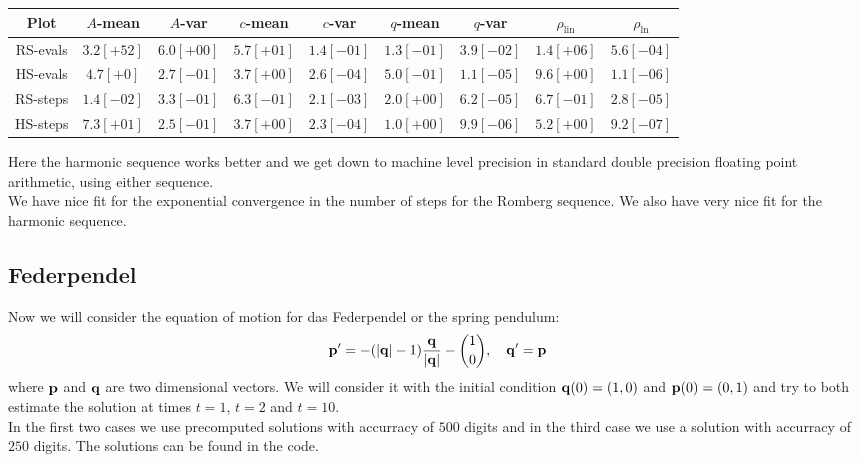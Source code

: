 \begin{table}[H]
    \centering
    \small
    \begin{tabular}{c||c|c|c|c|c|c|c|c}
Plot & \(A\)-mean & \(A\)-var & \(c\)-mean & \(c\)-var & \(q\)-mean & \(q\)-var & \(\rho_{\operatorname{lin}}\) & \(\rho_{\ln}\)\\\hline
\rowcolor{red}
RS-evals & \(3.2[+52]\) & \(6.0[+00]\) & \(5.7[+01]\) & \(1.4[-01]\) & \(1.3[-01]\) & \(3.9[-02]\) & \(1.4[+06]\) & \(5.6[-04]\) \\
\rowcolor{green}
HS-evals & \(4.7[+0]\) & \(2.7[-01]\) & \(3.7[+00]\) & \(2.6[-04]\) & \(5.0[-01]\) & \(1.1[-05]\) & \(9.6[+00]\) & \(1.1[-06]\) \\
\rowcolor{green}
RS-steps & \(1.4[-02]\) & \(3.3[-01]\) & \(6.3[-01]\) & \(2.1[-03]\) & \(2.0[+00]\) & \(6.2[-05]\) & \(6.7[-01]\) & \(2.8[-05]\) \\
\rowcolor{green}
HS-steps & \(7.3[+01]\) & \(2.5[-01]\) & \(3.7[+00]\) & \(2.3[-04]\) & \(1.0[+00]\) & \(9.9[-06]\) & \(5.2[+00]\) & \(9.2[-07]\) \\
    \end{tabular}
    \label{tab:my_label}
\end{table}

Here the harmonic sequence works better and we get down to machine level precision in standard double precision floating point arithmetic, using either sequence.\\

We have nice fit for the exponential convergence in the number of steps for the Romberg sequence. We also have very nice fit for the harmonic sequence.

\subsection{Federpendel}

Now we will consider the equation of motion for das Federpendel or the spring pendulum:
\[
\mathbf{p}' = -(|\mathbf{q}| - 1)\frac{\mathbf{q}}{|\mathbf{q}|} - {1\choose 0}, \quad \mathbf{q}' = \mathbf{p}
\]
where \(\mathbf{p}\) and \(\mathbf{q}\) are two dimensional vectors. We will consider it with the initial condition \(\mathbf{q}(0) = (1,0)\) and \(\mathbf{p}(0) = (0,1)\) and try to both estimate the solution at times \(t = 1\), \(t = 2\) and \(t=10\).\\

In the first two cases we use precomputed solutions with accurracy of \(500\) digits and in the third case we use a solution with accurracy of \(250\) digits. The solutions can be found in the code.


